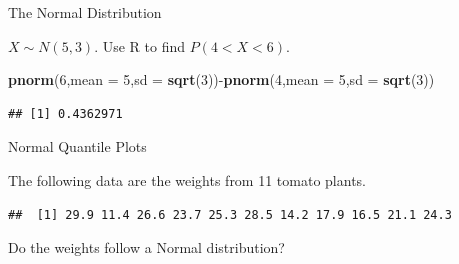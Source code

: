 \documentclass[9pt,ignorenonframetext,]{beamer}
\newenvironment{Shaded}{\begin{snugshade}}{\end{snugshade}}
\newcommand{\KeywordTok}[1]{\textcolor[rgb]{0.13,0.29,0.53}{\textbf{{#1}}}}
\newcommand{\DataTypeTok}[1]{\textcolor[rgb]{0.13,0.29,0.53}{{#1}}}
\newcommand{\DecValTok}[1]{\textcolor[rgb]{0.00,0.00,0.81}{{#1}}}
\newcommand{\NormalTok}[1]{{#1}}
\begin{document}
\begin{frame}[fragile]{The Normal Distribution}

\(X \sim N(5,3)\). Use R to find \(P(4<X<6)\).

\begin{Shaded}
\begin{Highlighting}[]
\KeywordTok{pnorm}\NormalTok{(}\DecValTok{6}\NormalTok{,}\DataTypeTok{mean =} \DecValTok{5}\NormalTok{,}\DataTypeTok{sd =} \KeywordTok{sqrt}\NormalTok{(}\DecValTok{3}\NormalTok{))-}\KeywordTok{pnorm}\NormalTok{(}\DecValTok{4}\NormalTok{,}\DataTypeTok{mean =} \DecValTok{5}\NormalTok{,}\DataTypeTok{sd =} \KeywordTok{sqrt}\NormalTok{(}\DecValTok{3}\NormalTok{))}
\end{Highlighting}
\end{Shaded}

\begin{verbatim}
## [1] 0.4362971
\end{verbatim}

\end{frame}

\begin{frame}[fragile]{Normal Quantile Plots}

The following data are the weights from 11 tomato plants.

\begin{verbatim}
##  [1] 29.9 11.4 26.6 23.7 25.3 28.5 14.2 17.9 16.5 21.1 24.3
\end{verbatim}

Do the weights follow a Normal distribution?

\end{frame}
\end{document}
